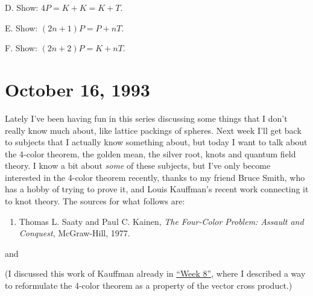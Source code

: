 \documentclass[12pt]{article}
\def\tightlist{}
\renewcommand{\texttt}[1]{%
  \begingroup
  \ttfamily
  \begingroup\lccode`~=`/\lowercase{\endgroup\def~}{/\discretionary{}{}{}}%
  \begingroup\lccode`~=`[\lowercase{\endgroup\def~}{[\discretionary{}{}{}}%
  \begingroup\lccode`~=`.\lowercase{\endgroup\def~}{.\discretionary{}{}{}}%
  \catcode`/=\active\catcode`[=\active\catcode`.=\active
  \scantokens{#1\noexpand}%
  \endgroup
}
\begin{document}
D. Show: \(4P = K + K = K + T\). 

E. Show: \((2n+1)P = P + nT\). 

F. Show: \((2n+2)P = K + nT\).



\hypertarget{week22}{%
\section{October 16, 1993}\label{week22}}

Lately I've been having fun in this series discussing some things that I
don't really know much about, like lattice packings of spheres. Next
week I'll get back to subjects that I actually know something about, but
today I want to talk about the 4-color theorem, the golden mean, the
silver root, knots and quantum field theory. I know a bit about
\emph{some} of these subjects, but I've only become interested in the
4-color theorem recently, thanks to my friend Bruce Smith, who has a
hobby of trying to prove it, and Louis Kauffman's recent work connecting
it to knot theory. The sources for what follows are:

\begin{enumerate}
\def\labelenumi{\arabic{enumi})}
\tightlist
\item
Thomas L. Saaty
  and Paul C. Kainen, 
  \emph{The Four-Color Problem: Assault and Conquest}, McGraw-Hill, 1977.
\end{enumerate}

and


(I discussed this work of Kauffman already in
\protect\hyperlink{week8}{``Week 8''}, where I described a way to
reformulate the 4-color theorem as a property of the vector cross
product.)
\end{document}
